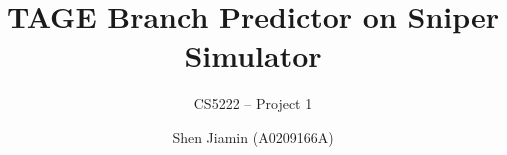 \documentclass[screen,nonacm]{acmart}
\begin{document}
\title{
  TAGE Branch Predictor on Sniper Simulator
}
\subtitle{
  CS5222 -- Project 1
}

\author{Shen Jiamin (A0209166A)}




\end{document}
